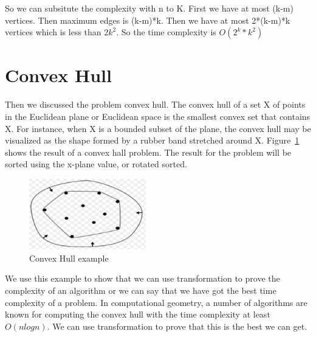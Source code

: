 \documentclass[usletter]{article}
\begin{document}
So we can subsitute the complexity with n to K. First we have at most (k-m) vertices. Then maximum edges is (k-m)*k. Then we have at most 2*(k-m)*k vertices which is less than $2k^2$. So the time complexity is $O(2^{k}*k^{2})$ 

\section{Convex Hull}
Then we discussed the problem convex hull.  The convex hull of a set X of points in the Euclidean plane or Euclidean space is the smallest convex set that contains X. For instance, when X is a bounded subset of the plane, the convex hull may be visualized as the shape formed by a rubber band stretched around X.
Figure~\ref{fig:convex-hull} shows the result of a convex hall problem. The result for the problem will be sorted using the x-plane value, or rotated sorted.

\begin{figure}[bht]
\begin{center}
     \includegraphics[width=2.0in]{figures/ch}
\caption{\label{fig:convex-hull}Convex Hull example}
\end{center}
\end{figure}

We use this example to show that we can use transformation to prove the complexity of an algorithm or we can say that we have got the best time complexity of a problem. In computational geometry, a number of algorithms are known for computing the convex hull with the time complexity at least $O(nlogn)$. We can use transformation to prove that this is the best we can get.
\end{document}
